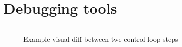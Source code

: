 %

\section{Debugging tools}

\begin{figure}[H]
    \inputminted[fontsize=\tiny]{diff}{Figures/APIA_Architecture/Examples/Authorization/Example_A/diff_test.snippet.txt}
    \caption{Example visual diff between two control loop steps}
    \label{fig:apia_diff_test}
\end{figure}
